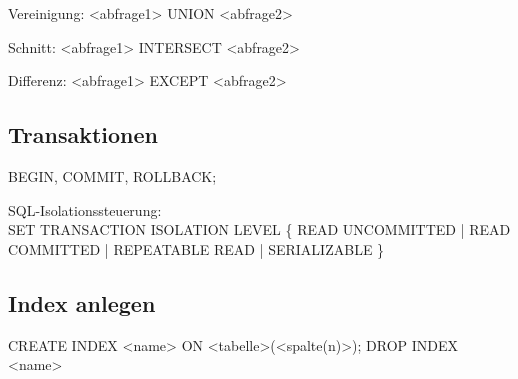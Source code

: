 Vereinigung: <abfrage1> UNION <abfrage2>  

Schnitt: <abfrage1> INTERSECT <abfrage2> 

Differenz: <abfrage1> EXCEPT <abfrage2>

\subsection{Transaktionen}
BEGIN, COMMIT, ROLLBACK;

SQL-Isolationssteuerung: \\
SET TRANSACTION ISOLATION LEVEL \{ READ UNCOMMITTED | READ COMMITTED | REPEATABLE READ | SERIALIZABLE \}

\subsection{Index anlegen}
CREATE INDEX <name> ON 	<tabelle>(<spalte(n)>); DROP INDEX <name>